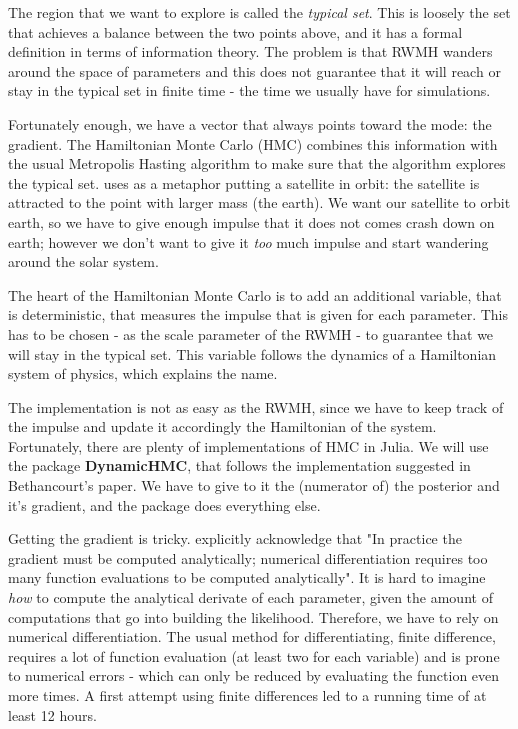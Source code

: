 \documentclass[12pt,a4paper]{article}
\begin{document}
The region that we want to explore is called the \emph{typical set}. This is loosely the set that achieves a balance between the two points above, and it has a formal definition in terms of information theory. The problem is that RWMH wanders around the space of parameters and this does not guarantee that it will reach or stay in the typical set in finite time - the time we usually have for simulations.

Fortunately enough, we have a vector that always points toward the mode: the gradient. The Hamiltonian Monte Carlo (HMC) combines this information with the usual Metropolis Hasting algorithm to make sure that the algorithm explores the typical set. \cite{Betancourt2017} uses as a metaphor putting a satellite in orbit: the satellite is attracted to the point with larger mass (the earth). We want our satellite to orbit earth, so we have to give enough impulse that it does not comes crash down on earth; however we don't want to give it \emph{too} much impulse and start wandering around the solar system.

The heart of the Hamiltonian Monte Carlo is to add an additional variable, that is deterministic, that measures the impulse that is given for each parameter. This has to be chosen - as the scale parameter of the RWMH - to guarantee that we will stay in the typical set. This variable follows the dynamics of a Hamiltonian system of physics, which explains the name.

The implementation is not as easy as the RWMH, since we have to keep track of the impulse and update it accordingly the Hamiltonian of the system. Fortunately, there are plenty of implementations of HMC in Julia. We will use the package \textbf{DynamicHMC}, that follows the implementation suggested in Bethancourt's paper. We have to give to it the (numerator of) the posterior and it's gradient, and the package does everything else.

Getting the gradient is tricky. \cite{Gelman2014} explicitly acknowledge that "In practice the gradient must be computed analytically; numerical differentiation requires too many function evaluations to be computed analytically". It is hard to imagine \emph{how} to compute the analytical derivate of each parameter, given the amount of computations that go into building the likelihood. Therefore, we have to rely on numerical differentiation. The usual method for differentiating, finite difference, requires a lot of function evaluation (at least two for each variable) and is prone to numerical errors - which can only be reduced by evaluating the function even more times. A first attempt using finite differences led to a running time of at least 12 hours.
\end{document}
